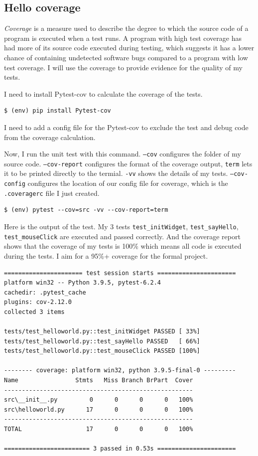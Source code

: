 \documentclass[a4paper]{report}
\begin{document}
\subsection{Hello coverage}

\emph{Coverage} is a measure used to describe the degree to which the source code of a program is executed when a test runs. A program with high test coverage has had more of its source code executed during testing, which suggests it has a lower chance of containing undetected software bugs compared to a program with low test coverage. I will use the coverage to provide evidence for the quality of my tests.

I need to install Pytest-cov to calculate the coverage of the tests.

\begin{verbatim}
$ (env) pip install Pytest-cov
\end{verbatim}

I need to add a config file for the Pytest-cov to exclude the test and debug code from the coverage calculation.


Now, I run the unit test with this command. \texttt{--cov} configures the folder of my source code. \texttt{--cov-report} configures the format of the coverage output, \texttt{term} lets it to be printed directly to the termial. \texttt{-vv} shows the details of my tests. \texttt{--cov-config} configures the location of our config file for coverage, which is the \texttt{.coveragerc} file I just created.

\begin{verbatim}
$ (env) pytest --cov=src -vv --cov-report=term
\end{verbatim}

Here is the output of the test. My 3 tests \texttt{test_initWidget}, \texttt{test_sayHello}, \texttt{test_mouseClick} are executed and passed correctly. And the coverage report shows that the coverage of my tests is 100\% which means all code is executed during the tests. I aim for a 95\%+ coverage for the formal project.

\begin{verbatim}
====================== test session starts ======================
platform win32 -- Python 3.9.5, pytest-6.2.4
cachedir: .pytest_cache
plugins: cov-2.12.0
collected 3 items

tests/test_helloworld.py::test_initWidget PASSED [ 33%]
tests/test_helloworld.py::test_sayHello PASSED   [ 66%]
tests/test_helloworld.py::test_mouseClick PASSED [100%]

-------- coverage: platform win32, python 3.9.5-final-0 ---------
Name                Stmts   Miss Branch BrPart  Cover
-----------------------------------------------------
src\__init__.py         0      0      0      0   100%
src\helloworld.py      17      0      0      0   100%
-----------------------------------------------------
TOTAL                  17      0      0      0   100%

======================== 3 passed in 0.53s ======================
\end{verbatim}
\end{document}
